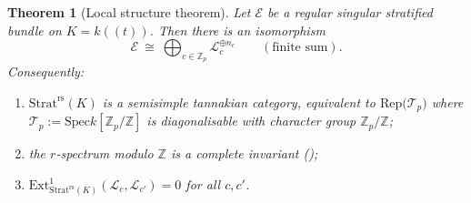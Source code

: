 \documentclass[11pt,reqno]{amsart}
\newcommand{\Zp}{\mathbb{Z}_p}
\newcommand{\ZZ}{\mathbb{Z}}
\newcommand{\cE}{\mathcal{E}}
\newcommand{\cL}{\mathcal{L}}
\newcommand{\cT}{\mathcal{T}}
\newcommand{\Strat}{\mathrm{Strat}}
\newcommand{\rs}{\mathrm{rs}}
\newcommand{\Rep}{\mathrm{Rep}}
\newcommand{\Ext}{\mathrm{Ext}}
\newcommand{\Spec}{\mathrm{Spec}}
\theoremstyle{plain}
\newtheorem{theorem}{Theorem}[section]
\theoremstyle{definition}
\theoremstyle{remark}
\numberwithin{equation}{section}
\begin{document}
\begin{theorem}[Local structure theorem]\label{thm:localstructure}
Let $\cE$ be a regular singular stratified bundle on $K=k((t))$.  Then
there is an isomorphism
\[
   \cE\ \cong\ \bigoplus_{c\in\Zp}\cL_c^{\oplus n_c}\qquad(\text{finite sum}).
\]
Consequently:
\begin{enumerate}
\item $\Strat^{\rs}(K)$ is a semisimple tannakian category, equivalent to
      $\Rep\bigl(\cT_p\bigr)$ where
      $\cT_p:=\Spec k[\Zp/\ZZ]$ is diagonalisable with character group
      $\Zp/\ZZ$;
\item the $r$-spectrum \emph{modulo $\ZZ$} is a complete invariant
      ();
\item $\Ext^1_{\Strat^{\rs}(K)}(\cL_c,\cL_{c'})=0$ for all $c,c'$.
\end{enumerate}
\end{theorem}
\end{document}
